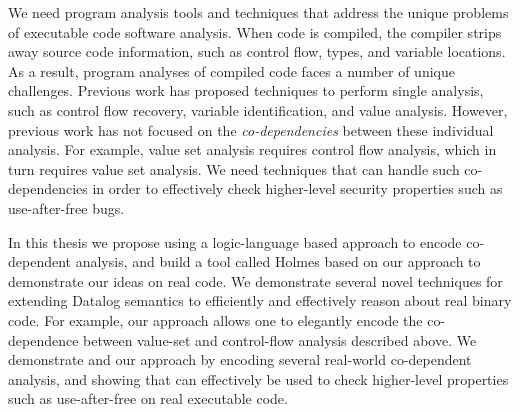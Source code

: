 We need program analysis tools and techniques that address the unique
problems of executable code software analysis.
When code is compiled, the compiler strips away source code
information, such as control flow, types, and variable locations.  As
a result, program analyses of compiled code faces a number of unique
challenges. %
Previous work has proposed techniques to perform single analysis, such
as control flow recovery, variable identification, and value analysis.
However, previous work has not focused on the \emph{co-dependencies}
between these individual analysis. For example, value set analysis
requires control flow analysis, which in turn requires value set
analysis. We need techniques that can handle such co-dependencies in
order to effectively check higher-level
security properties such as use-after-free bugs. %





In this thesis we propose using a logic-language based approach to
encode co-dependent analysis, and build a tool called Holmes based on
our approach to demonstrate our ideas on real code. We demonstrate
several novel techniques for extending Datalog semantics to
efficiently and effectively reason about real binary code. For
example, our approach allows one to elegantly encode the co-dependence
between value-set and control-flow analysis described above. We
demonstrate {\sysname} and our approach by encoding several real-world
co-dependent analysis, and showing that {\sysname} can effectively be
used to check higher-level properties such as use-after-free on real
executable code.

